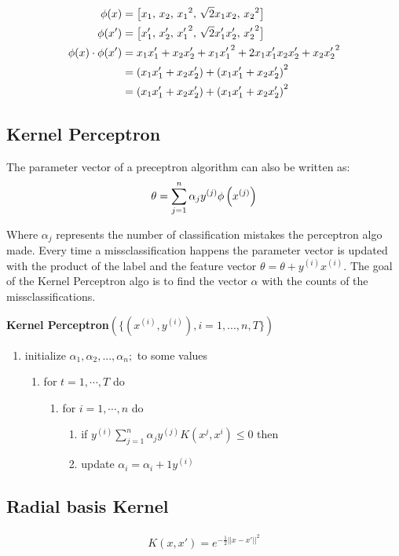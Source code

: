 \begin{align*}
\displaystyle  \phi (x) \displaystyle &= \big [x_1, \, x_2,\,  {x_1}^2,\,  \sqrt{2}x_1x_2,\,  {x_2}^2 \big ]\\
\displaystyle \phi (x') \displaystyle &= \big [x_1^\prime ,\,  x_2^\prime ,\,  {x_1^\prime }^2,\,  \sqrt{2}x_1^\prime x_2^\prime ,\,  {x_2^\prime }^2 \big ]\\
\displaystyle  \phi (x) \cdot \phi (x^\prime )&=\displaystyle {x_1}{x_1^\prime } + {x_2}{x_2^\prime } + {x_1x_1^\prime }^2 + 2{x_1}{x_1^\prime }{x_2}{x_2^\prime } + {x_2x_2^\prime }^2\\
&=\displaystyle \left({x_1}{x_1^\prime } + {x_2}{x_2^\prime }\right)+ \left({x_1}{x_1^\prime } + {x_2}{x_2^\prime }\right)^2\\
&=\displaystyle \left({x_1}{x_1^\prime } + {x_2}{x_2^\prime }\right)+ \left({x_1}{x_1^\prime } + {x_2}{x_2^\prime }\right)^2
\end{align*}

\subsection{Kernel Perceptron}

The parameter vector of a preceptron algorithm can also be written as: 
\begin{align*}
\displaystyle  \displaystyle \theta = \sum _{j=1}^{n} \alpha _ j y^{(j)} \phi \left(x^{(j)}\right)
\end{align*}

Where $\alpha_j$ represents the number of classification mistakes the perceptron algo made. Every time a missclassification happens the parameter vector is updated with the product of the label and the feature vector $\theta  = \theta + y^{(i)} x^{(i)}$. The goal of the Kernel Perceptron algo is to find the vector $\alpha$ with the counts of the missclassifications.

\textbf{Kernel Perceptron}$\displaystyle \left(\big \{ (x^{(i)}, y^{(i)}), i=1,...,n, T \big \} \right)$
\begin{enumerate}[\indent {}]
	\item initialize  $\alpha _1, \alpha _2, ..., \alpha _ n;$ to some values
	\begin{enumerate}[\indent {}]
		\item for $t=1,\cdots,T$ do
		\begin{enumerate}[\indent {}]
			\item for $i=1,\cdots,n$ do
			\begin{enumerate}[\indent {}]
				\item if $y^{(i)}\sum _{j=1}^{n} \alpha _ j y^{(j)} K(x^{j},x^{i}) \leq 0$ then
				\item update $\alpha _ i = \alpha _ i +1 y^{(i)}$
			\end{enumerate}
		\end{enumerate}
	\end{enumerate}
\end{enumerate}

\subsection{Radial basis Kernel}
\begin{align*}
K(x,x') = e^{-\frac{1}{2} {||x-x'||}^2}
\end{align*}
